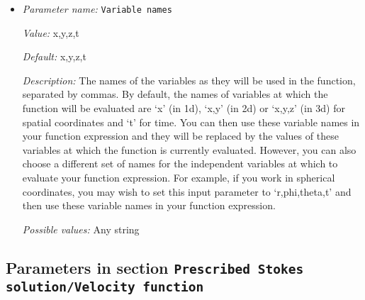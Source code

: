 \begin{itemize}
{\it Possible values:} Any string
\item {\it Parameter name:} {\tt Variable names}
\label{parameters:Prescribed Stokes solution/Pressure function/Variable names}
\label{parameters:Prescribed_20Stokes_20solution/Pressure_20function/Variable_20names}


{\it Value:} x,y,z,t


{\it Default:} x,y,z,t


{\it Description:} The names of the variables as they will be used in the function, separated by commas. By default, the names of variables at which the function will be evaluated are `x' (in 1d), `x,y' (in 2d) or `x,y,z' (in 3d) for spatial coordinates and `t' for time. You can then use these variable names in your function expression and they will be replaced by the values of these variables at which the function is currently evaluated. However, you can also choose a different set of names for the independent variables at which to evaluate your function expression. For example, if you work in spherical coordinates, you may wish to set this input parameter to `r,phi,theta,t' and then use these variable names in your function expression.


{\it Possible values:} Any string
\end{itemize}

\subsection{Parameters in section \tt Prescribed Stokes solution/Velocity function}
\label{parameters:Prescribed_20Stokes_20solution/Velocity_20function}

